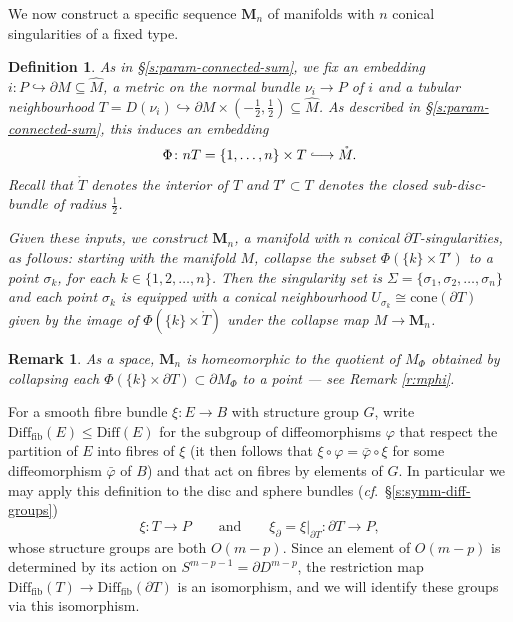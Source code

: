 \documentclass[reqno,a4paper]{article}
\numberwithin{equation}{section}
\theoremstyle{italicised}
\theoremstyle{upright}
\newtheorem{defn}[thm]{Definition}
\newtheorem{rmk}[thm]{Remark}
\theoremstyle{italicised-restate}
\newcommand{\lhto}{\lhook\joinrel\longrightarrow}
\newcommand{\cf}{\textit{cf}.\ }
\renewcommand{\leq}{\leqslant}
\begin{document}
We now construct a specific sequence $\mathbf{M}_n$ of manifolds with $n$ conical singularities of a fixed type.

\begin{defn}\label{d:sequence-Mn}
As in \S\ref{s:param-connected-sum}, we fix an embedding $i \colon P \hookrightarrow \partial M \subseteq \hat{M}$, a metric on the normal bundle $\nu_i \to P$ of $i$ and a tubular neighbourhood $T = D(\nu_i) \hookrightarrow \partial M \times (-\tfrac12,\tfrac12) \subseteq \hat{M}$. As described in \S\ref{s:param-connected-sum}, this induces an embedding
\[
\Phi \colon nT = \{1,\ldots,n\} \times T \lhto \mathring{M}.
\]
Recall that $\mathring{T}$ denotes the interior of $T$ and $T' \subset T$ denotes the closed sub-disc-bundle of radius $\tfrac12$.

Given these inputs, we construct $\mathbf{M}_n$, a manifold with $n$ conical $\partial T$-singularities, as follows: starting with the manifold $M$, collapse the subset $\Phi(\{k\} \times T')$ to a point $\sigma_k$, for each $k \in \{1,2,\ldots,n\}$. Then the singularity set is $\Sigma = \{\sigma_1,\sigma_2,\ldots,\sigma_n\}$ and each point $\sigma_k$ is equipped with a conical neighbourhood $U_{\sigma_k} \cong \mathrm{cone}(\partial T)$ given by the image of $\Phi(\{k\} \times \mathring{T})$ under the collapse map $M \to \mathbf{M}_n$.
\end{defn}

\begin{rmk}
As a space, $\mathbf{M}_n$ is homeomorphic to the quotient of $M_\Phi$ obtained by collapsing each $\Phi(\{k\} \times \partial T) \subset \partial M_\Phi$ to a point --- see Remark \ref{r:mphi}.
\end{rmk}

For a smooth fibre bundle $\xi \colon E \to B$ with structure group $G$, write $\mathrm{Diff}_{\mathrm{fib}}(E) \leq \mathrm{Diff}(E)$ for the subgroup of diffeomorphisms $\varphi$ that respect the partition of $E$ into fibres of $\xi$ (it then follows that $\xi \circ \varphi = \bar{\varphi} \circ \xi$ for some diffeomorphism $\bar{\varphi}$ of $B$) and that act on fibres by elements of $G$. In particular we may apply this definition to the disc and sphere bundles (\cf \S\ref{s:symm-diff-groups})
\[
\xi \colon T \longrightarrow P \qquad\text{and}\qquad \xi_\partial = \xi|_{\partial T} \colon \partial T \longrightarrow P,
\]
whose structure groups are both $O(m-p)$. Since an element of $O(m-p)$ is determined by its action on $S^{m-p-1} = \partial D^{m-p}$, the restriction map $\mathrm{Diff}_{\mathrm{fib}}(T) \to \mathrm{Diff}_{\mathrm{fib}}(\partial T)$ is an isomorphism, and we will identify these groups via this isomorphism.
\end{document}
